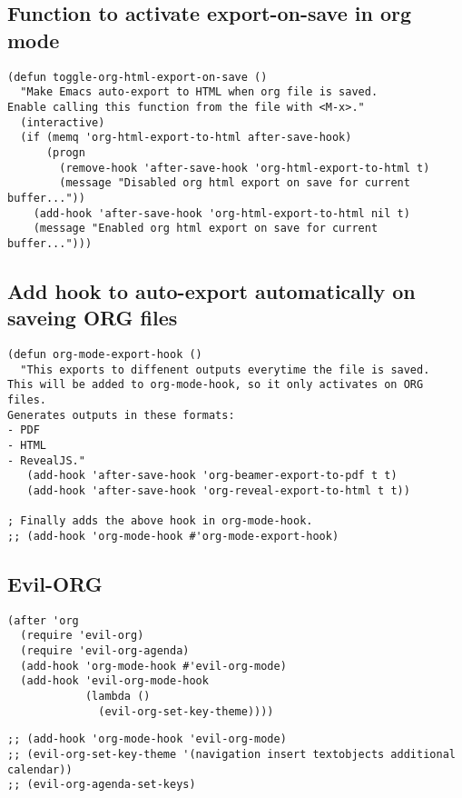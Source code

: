 \documentclass[11pt]{article}
\begin{document}
\subsection*{Function to activate export-on-save in org mode}
\label{sec:orge44aa36}

\begin{verbatim}
(defun toggle-org-html-export-on-save ()
  "Make Emacs auto-export to HTML when org file is saved.
Enable calling this function from the file with <M-x>."
  (interactive)
  (if (memq 'org-html-export-to-html after-save-hook)
      (progn
        (remove-hook 'after-save-hook 'org-html-export-to-html t)
        (message "Disabled org html export on save for current buffer..."))
    (add-hook 'after-save-hook 'org-html-export-to-html nil t)
    (message "Enabled org html export on save for current buffer...")))
\end{verbatim}


\subsection*{Add hook to auto-export automatically on saveing ORG files}
\label{sec:orgbcf3fcb}

\begin{verbatim}
(defun org-mode-export-hook ()
  "This exports to diffenent outputs everytime the file is saved.
This will be added to org-mode-hook, so it only activates on ORG files.
Generates outputs in these formats:
- PDF
- HTML
- RevealJS."
   (add-hook 'after-save-hook 'org-beamer-export-to-pdf t t)
   (add-hook 'after-save-hook 'org-reveal-export-to-html t t))

; Finally adds the above hook in org-mode-hook.
;; (add-hook 'org-mode-hook #'org-mode-export-hook)
\end{verbatim}


\subsection*{Evil-ORG}
\label{sec:org68b5d16}


\begin{verbatim}
(after 'org
  (require 'evil-org)
  (require 'evil-org-agenda)
  (add-hook 'org-mode-hook #'evil-org-mode)
  (add-hook 'evil-org-mode-hook
            (lambda ()
              (evil-org-set-key-theme))))
\end{verbatim}

\begin{verbatim}
;; (add-hook 'org-mode-hook 'evil-org-mode)
;; (evil-org-set-key-theme '(navigation insert textobjects additional calendar))
;; (evil-org-agenda-set-keys)
\end{verbatim}
\end{document}

